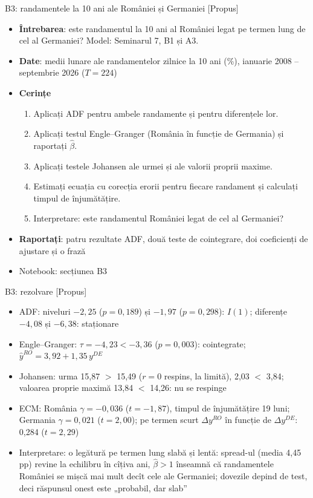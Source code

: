 \begin{frame}{B3: randamentele la 10 ani ale României și Germaniei [Propus]}
\itemsize{\footnotesize}
\begin{itemize}
\item \textbf{Întrebarea}: este randamentul la 10 ani al României legat pe termen lung de cel al Germaniei? Model: Seminarul 7, B1 și A3.
\item \textbf{Date}: medii lunare ale randamentelor zilnice la 10 ani (\%), ianuarie 2008 -- septembrie 2026 ($T = 224$)
\item \textbf{Cerințe}
\begin{enumerate}
    \item Aplicați ADF pentru ambele randamente și pentru diferențele lor.
    \item Aplicați testul Engle--Granger (România în funcție de Germania) și raportați $\hat\beta$.
    \item Aplicați testele Johansen ale urmei și ale valorii proprii maxime.
    \item Estimați ecuația cu corecția erorii pentru fiecare randament și calculați timpul de înjumătățire.
    \item Interpretare: este randamentul României legat de cel al Germaniei?
\end{enumerate}
\item \textbf{Raportați}: patru rezultate ADF, două teste de cointegrare, doi coeficienți de ajustare și o frază
\item Notebook: secțiunea B3
\end{itemize}
\end{frame}

\ifsolutions
\begin{frame}{B3: rezolvare [Propus]}
\itemsize{\scriptsize}
\begin{itemize}
    \item ADF: niveluri $\ensuremath{-}2{,}25$ ($p = 0{,}189$) și $\ensuremath{-}1{,}97$ ($p = 0{,}298$): $I(1)$; diferențe $\ensuremath{-}4{,}08$ și $\ensuremath{-}6{,}38$: staționare
    \item Engle--Granger: $\tau = \ensuremath{-}4{,}23 < \ensuremath{-}3{,}36$ ($p = 0{,}003$): cointegrate; $\hat y^{RO} = 3{,}92 + 1{,}35\,y^{DE}$
    \item Johansen: urma 15{,}87 $>$ 15{,}49 ($r = 0$ respins, la limită), 2{,}03 $<$ 3{,}84; valoarea proprie maximă 13{,}84 $<$ 14{,}26: nu se respinge
    \item ECM: România $\gamma = \ensuremath{-}0{,}036$ ($t = \ensuremath{-}1{,}87$), timpul de înjumătățire 19 luni; Germania $\gamma = 0{,}021$ ($t = 2{,}00$); pe termen scurt $\Delta y^{RO}$ în funcție de $\Delta y^{DE}$: 0{,}284 ($t = 2{,}29$)
    \item Interpretare: o legătură pe termen lung slabă și lentă: spread-ul (media 4{,}45 pp) revine la echilibru în cîțiva ani, $\hat\beta > 1$ înseamnă că randamentele României se mișcă mai mult decît cele ale Germaniei; dovezile depind de test, deci răspunsul onest este „probabil, dar slab”
\end{itemize}
\end{frame}
\fi


